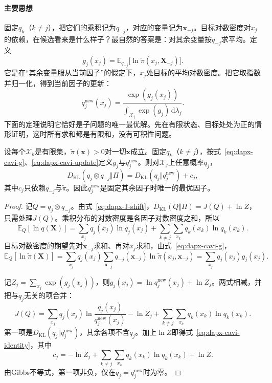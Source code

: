 \paragraph{主要思想}
固定$q_k$（$k\neq j$），把它们的乘积记为$q_{-j}$，对应的变量记为$\bm{x}_{-j}$。目标对数密度对$x_j$的依赖，在候选看来是什么样子？最自然的答案是：对其余变量按$q_{-j}$求平均。定义
\begin{equation}
 g_j(x_j)=\mathbb{E}_{q_{-j}}\bigl[\ln\widetilde{\pi}(x_j,\bm{X}_{-j})\bigr] .
 \label{eq:dapx-cavi-g}
\end{equation}
它是在“其余变量服从当前因子”的假定下，$x_j$处目标的平均对数密度。把它取指数并归一化，得到当前因子的更新：
\begin{equation}
 q_j^{\mathrm{new}}(x_j)=\frac{\exp(g_j(x_j))}{\int_{\mathcal{X}_j}\exp(g_j)\,\mathrm{d}\lambda_j} .
 \label{eq:dapx-cavi-update}
\end{equation}
下面的定理说明它恰好是子问题的唯一最优解。先在有限状态、目标处处为正的情形证明，这时所有求和都是有限和，没有可积性问题。

\begin{theorem}[逐因子最优更新]
\label{thm:dapx-cavi}
设每个$\mathcal{X}_k$是有限集，$\widetilde{\pi}(\bm{x})>0$对一切$\bm{x}$成立。固定$q_k$（$k\neq j$），按式~\eqref{eq:dapx-cavi-g}、\eqref{eq:dapx-cavi-update}定义$g_j$与$q_j^{\mathrm{new}}$。则对$\mathcal{X}_j$上任意概率$q_j$，
\begin{equation}
 D_{\mathrm{KL}}(q_j\otimes q_{-j}\Vert\Pi)=D_{\mathrm{KL}}(q_j\Vert q_j^{\mathrm{new}})+c_j ,
 \label{eq:dapx-cavi-identity}
\end{equation}
其中$c_j$只依赖$q_{-j}$与$\widetilde{\pi}$。因此$q_j^{\mathrm{new}}$是固定其余因子时唯一的最优因子。
\end{theorem}

\begin{proof}
记$Q=q_j\otimes q_{-j}$。由式~\eqref{eq:dapx-J-shift}，$D_{\mathrm{KL}}(Q\Vert\Pi)=J(Q)+\ln Z$，只需处理$J(Q)$。乘积分布的对数密度是各因子对数密度之和，所以
\[
 \mathbb{E}_{Q}[\ln q(\bm{X})]=\sum_{x_j}q_j(x_j)\ln q_j(x_j)+\sum_{k\neq j}\sum_{x_k}q_k(x_k)\ln q_k(x_k) .
\]
目标对数密度的期望先对$\bm{x}_{-j}$求和、再对$x_j$求和，由式~\eqref{eq:dapx-cavi-g}，
\[
 \mathbb{E}_{Q}[\ln\widetilde{\pi}(\bm{X})]=\sum_{x_j}q_j(x_j)\sum_{\bm{x}_{-j}}q_{-j}(\bm{x}_{-j})\ln\widetilde{\pi}(x_j,\bm{x}_{-j})=\sum_{x_j}q_j(x_j)g_j(x_j) .
\]

记$Z_j=\sum_{x_j}\exp(g_j(x_j))$，则$g_j(x_j)=\ln q_j^{\mathrm{new}}(x_j)+\ln Z_j$。两式相减，并把与$q_j$无关的项合并：
\[
 J(Q)=\sum_{x_j}q_j(x_j)\ln\frac{q_j(x_j)}{q_j^{\mathrm{new}}(x_j)}-\ln Z_j+\sum_{k\neq j}\sum_{x_k}q_k(x_k)\ln q_k(x_k) .
\]
第一项是$D_{\mathrm{KL}}(q_j\Vert q_j^{\mathrm{new}})$，其余各项不含$q_j$。加上$\ln Z$即得式~\eqref{eq:dapx-cavi-identity}，其中
\[
 c_j=-\ln Z_j+\sum_{k\neq j}\sum_{x_k}q_k(x_k)\ln q_k(x_k)+\ln Z .
\]
由Gibbs不等式，第一项非负，仅在$q_j=q_j^{\mathrm{new}}$时为零。
\end{proof}

